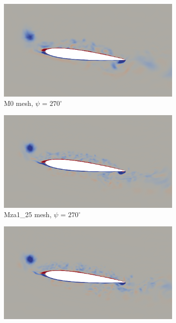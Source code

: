 \begin{figure}[H]
	\centering
	\begin{center}
		\begin{subfigure}[b]{0.475\textwidth}
			\centering
			\includegraphics[width=1\textwidth]{figures/zonal_adapt_results/vorticity_plots_Re200k/M0/phase_270.png}
			\caption{M0 mesh, $\psi$ = $270^\circ$}
			\label{fig:M0_Re200k_sp_psi270}
		\end{subfigure}
	\end{center}
	\begin{subfigure}[b]{0.475\textwidth}
		\centering
		\includegraphics[width=1\textwidth]{figures/zonal_adapt_results/vorticity_plots_Re200k/Mza1_50/phase_270.png}
		\caption{Mza1\_25 mesh, $\psi$ = $270^\circ$}
		\label{fig:Mza1_50_Re200k_sp_psi270}
	\end{subfigure}
	\begin{subfigure}[b]{0.475\textwidth}
		\centering
		\includegraphics[width=1\textwidth]{figures/zonal_adapt_results/vorticity_plots_Re200k/Mza1_100/phase_270.png}

\end{subfigure}
\end{figure}
